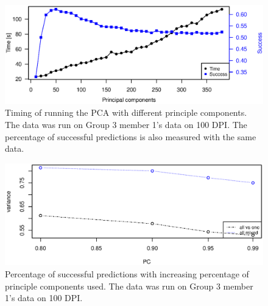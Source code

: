 \begin{figure}[H]
\centering
\includegraphics[width =0.95 \textwidth]{graphics/pca_timing}
\caption{Timing of running the PCA with different principle components. 
The data was run on Group 3 member 1's data on 100 DPI. 
The percentage of successful predictions is also measured with the same data.}
\label{fig:pca_timing}
\end{figure}

\begin{figure}[H]
\centering
\includegraphics[width =0.95 \textwidth]{graphics/pca_success}
\caption{Percentage of successful predictions with increasing percentage of principle components used.
The data was run on Group 3 member 1's data on 100 DPI. }
\label{fig:pca_success}
\end{figure}

